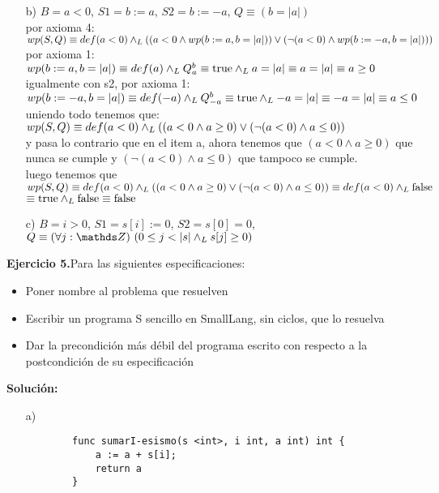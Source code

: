 \documentclass{article}
\begin{document}
\begin{enumerate}
	\item [b)] $B = a < 0$, $S1 = b := a$, $S2 = b := -a$, $Q \equiv (b = |a|)$\\
	por axioma 4: $wp(S,Q) \equiv def(a < 0) \land _L ((a < 0 \land wp(b := a, b = |a|)) \lor (\lnot (a < 0) \land wp(b := -a, b = |a|)))$\\
	por axioma 1: $wp(b := a, b = |a|) \equiv def(a) \land _L Q^{b}_{a} \equiv \mathrm{true} \land _L a = |a| \equiv a = |a| \equiv a \geq 0$\\
	igualmente con s2, por axioma 1: $wp(b := -a, b = |a|) \equiv def(-a) \land _L Q^{b}_{-a} \equiv \mathrm{true} \land _L -a = |a| \equiv -a = |a| \equiv a \leq 0$\\
	uniendo todo tenemos que: $wp(S,Q) \equiv def(a < 0) \land _L ((a < 0 \land a \geq 0) \lor (\lnot (a < 0) \land a \leq 0))$\\
	y pasa lo contrario que en el item a, ahora tenemos que $(a < 0 \land a \geq 0)$ que nunca se cumple y $(\lnot (a < 0) \land a \leq 0)$ que tampoco se cumple.\\
	luego tenemos que $wp(S,Q) \equiv def(a < 0) \land _L ((a < 0 \land a \geq 0) \lor (\lnot (a < 0) \land a \leq 0)) \equiv def(a < 0) \land _L \mathrm{false}$\\
	$\equiv \mathrm{true} \land _L \mathrm{false} \equiv \mathrm{false}$\\

	\item [c)] $B = i > 0$, $S1 = s[i] := 0$, $S2 = s[0] = 0$, $Q \equiv \paraTodo[unalinea]{j}{\ent}{0 \leq j < |s| \yLuego s[j] \geq 0}$
\end{enumerate}

\textbf{Ejercicio 5.}Para las siguientes especificaciones:
\begin{itemize}
	\item Poner nombre al problema que resuelven
	\item Escribir un programa S sencillo en SmallLang, sin ciclos, que lo resuelva
	\item Dar la precondici\'on m\'as d\'ebil del programa escrito con respecto a la postcondici\'on de su especificaci\'on
\end{itemize}
\textbf{Soluci\'on:}
\begin{itemize}
	\item [a)]
	\begin{lstlisting}
		func sumarI-esismo(s <int>, i int, a int) int {
			a := a + s[i];
			return a
		}
	\end{lstlisting}
\end{itemize}
\end{document}
